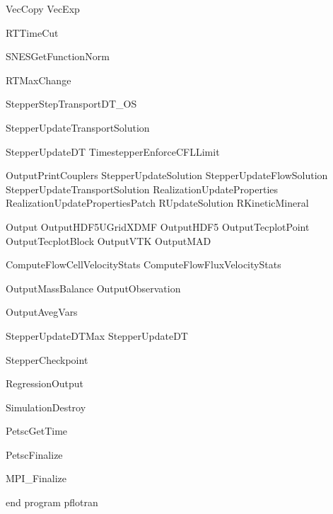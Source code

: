 			VecCopy
			VecExp
			
			RTTimeCut
			
			SNESGetFunctionNorm
			
			RTMaxChange
			
		StepperStepTransportDT_OS
	
		StepperUpdateTransportSolution
	
		StepperUpdateDT
		TimestepperEnforceCFLLimit
	
		OutputPrintCouplers
		StepperUpdateSolution
			StepperUpdateFlowSolution
			StepperUpdateTransportSolution
				RealizationUpdateProperties
					RealizationUpdatePropertiesPatch
						RUpdateSolution
							RKineticMineral
	
		Output
			OutputHDF5UGridXDMF
			OutputHDF5
			OutputTecplotPoint
			OutputTecplotBlock
			OutputVTK
			OutputMAD
			
			ComputeFlowCellVelocityStats
			ComputeFlowFluxVelocityStats
			
			OutputMassBalance
			OutputObservation
			
			OutputAvegVars
			
		StepperUpdateDTMax
		StepperUpdateDT
	
		StepperCheckpoint

	RegressionOutput

	SimulationDestroy

	PetscGetTime

	PetscFinalize

	MPI_Finalize

end program pflotran
